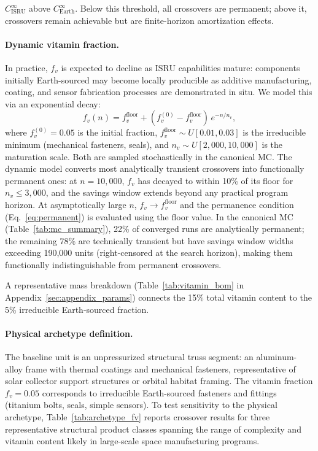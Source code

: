 \documentclass[preprint,12pt]{elsarticle}
\begin{document}
$C_{\mathrm{ISRU}}^{\infty}$ above $C_{\mathrm{Earth}}^{\infty}$. Below this threshold, all crossovers are permanent; above it, crossovers remain achievable but are finite-horizon amortization effects.

\paragraph{Dynamic vitamin fraction.} In practice, $f_v$ is expected to decline as ISRU capabilities mature: components initially Earth-sourced may become locally producible as additive manufacturing, coating, and sensor fabrication processes are demonstrated in situ. We model this via an exponential decay:
\begin{equation}
  f_v(n) = f_v^{\mathrm{floor}} + (f_v^{(0)} - f_v^{\mathrm{floor}}) \, e^{-n/n_v},
  \label{eq:vitamin_dynamic}
\end{equation}
where $f_v^{(0)} = 0.05$ is the initial fraction, $f_v^{\mathrm{floor}} \sim U[0.01, 0.03]$ is the irreducible minimum (mechanical fasteners, seals), and $n_v \sim U[2{,}000, 10{,}000]$ is the maturation scale. Both are sampled stochastically in the canonical MC. The dynamic model converts most analytically transient crossovers into functionally permanent ones: at $n = 10{,}000$, $f_v$ has decayed to within 10\% of its floor for $n_v \leq 3{,}000$, and the savings window extends beyond any practical program horizon. At asymptotically large $n$, $f_v \to f_v^{\mathrm{floor}}$ and the permanence condition (Eq.~\ref{eq:permanent}) is evaluated using the floor value. In the canonical MC (Table~\ref{tab:mc_summary}), 22\% of converged runs are analytically permanent; the remaining 78\% are technically transient but have savings window widths exceeding 190{,}000 units (right-censored at the search horizon), making them functionally indistinguishable from permanent crossovers.

A representative mass breakdown (Table~\ref{tab:vitamin_bom} in Appendix~\ref{sec:appendix_params}) connects the 15\% total vitamin content to the 5\% irreducible Earth-sourced fraction.

\paragraph{Physical archetype definition.}
\label{sec:archetype}
The baseline unit is an unpressurized structural truss segment: an aluminum-alloy frame with thermal coatings and mechanical fasteners, representative of solar collector support structures or orbital habitat framing. The vitamin fraction $f_v = 0.05$ corresponds to irreducible Earth-sourced fasteners and fittings (titanium bolts, seals, simple sensors). To test sensitivity to the physical archetype, Table~\ref{tab:archetype_fv} reports crossover results for three representative structural product classes spanning the range of complexity and vitamin content likely in large-scale space manufacturing programs.
\end{document}
